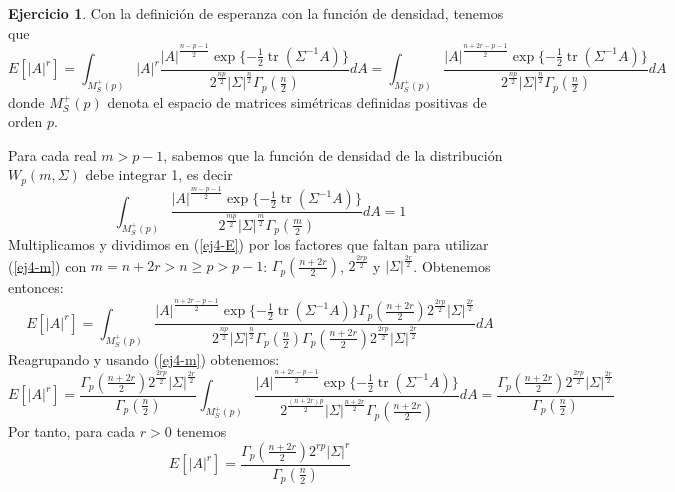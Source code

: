 \documentclass[12pt,spanish]{article}
\theoremstyle{definition}
\newtheorem{exercise}{Ejercicio}
\begin{document}
\begin{exercise} %
  Con la definición de esperanza con la función de densidad, tenemos que
  \begin{equation}\label{ej4-E}
    E[|A|^r]=\int_{M_S^+(p)}|A|^r\frac{|A|^\frac{n-p-1}{2}\exp\{-\frac{1}{2}\operatorname{tr}(\Sigma^{-1}A)\}}{2^\frac{np}{2}|\Sigma|^\frac{n}{2}\Gamma_p(\frac{n}{2})}dA=\int_{M_S^+(p)}\frac{|A|^\frac{n+2r-p-1}{2}\exp\{-\frac{1}{2}\operatorname{tr}(\Sigma^{-1}A)\}}{2^\frac{np}{2}|\Sigma|^\frac{n}{2}\Gamma_p(\frac{n}{2})}dA\end{equation}
  donde $M_S^+(p)$ denota el espacio de matrices simétricas definidas positivas de orden $p$.

  Para cada real $m>p-1$, sabemos que la función de densidad de la distribución $W_p(m,\Sigma)$ debe integrar 1, es decir
  \begin{equation}\label{ej4-m}\int_{M_S^+(p)}\frac{|A|^\frac{m-p-1}{2}\exp\{-\frac{1}{2}\operatorname{tr}(\Sigma^{-1}A)\}}{2^\frac{mp}{2}|\Sigma|^\frac{m}{2}\Gamma_p(\frac{m}{2})}dA=1\end{equation}
  Multiplicamos y dividimos en (\ref{ej4-E}) por los factores que
  faltan para utilizar (\ref{ej4-m}) con $m=n+2r>n\geq p>p-1$:
  $\Gamma_p(\frac{n+2r}{2})$, $2^\frac{2rp}{2}$ y $|\Sigma|^\frac{2r}{2}$. Obtenemos entonces:
  \[E[|A|^r]=\int_{M_S^+(p)}\frac{|A|^\frac{n+2r-p-1}{2}\exp\{-\frac{1}{2}\operatorname{tr}(\Sigma^{-1}A)\}\Gamma_p(\frac{n+2r}{2})2^\frac{2rp}{2}|\Sigma|^\frac{2r}{2}}{2^\frac{np}{2}|\Sigma|^\frac{n}{2}\Gamma_p(\frac{n}{2})\Gamma_p(\frac{n+2r}{2})2^\frac{2rp}{2}|\Sigma|^\frac{2r}{2}}dA\]
  Reagrupando y usando (\ref{ej4-m}) obtenemos:
  \[E[|A|^r]=\frac{\Gamma_p(\frac{n+2r}{2})2^\frac{2rp}{2}|\Sigma|^\frac{2r}{2}}{\Gamma_p(\frac{n}{2})}\int_{M_S^+(p)}\frac{|A|^\frac{n+2r-p-1}{2}\exp\{-\frac{1}{2}\operatorname{tr}(\Sigma^{-1}A)\}}{2^\frac{(n+2r)p}{2}|\Sigma|^\frac{n+2r}{2}\Gamma_p(\frac{n+2r}{2})}dA=\frac{\Gamma_p(\frac{n+2r}{2})2^\frac{2rp}{2}|\Sigma|^\frac{2r}{2}}{\Gamma_p(\frac{n}{2})}\]
  Por tanto, para cada $r>0$ tenemos
  \[E[|A|^r]=\frac{\Gamma_p(\frac{n+2r}{2})2^{rp}|\Sigma|^r}{\Gamma_p(\frac{n}{2})}\]
\end{exercise}
\end{document}
